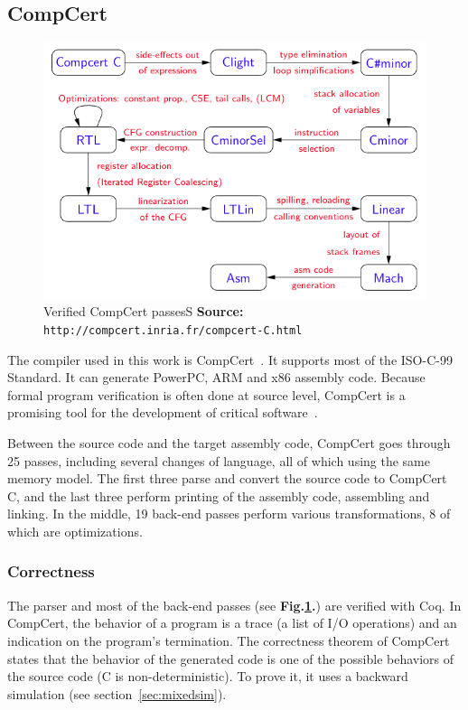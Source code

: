 \label{sec:prelim}
\subsection{CompCert}
\begin{figure}
\begin{center}
\includegraphics[scale=1.15]{img/passes.png}
\caption{Verified CompCert passes\hspace{\linewidth}S \textbf{Source: }\texttt{http://compcert.inria.fr/compcert-C.html}}
\label{fig:compcertpasses}
\end{center}
\end{figure}

The compiler used in this work is CompCert~\cite{compcertmanual}.
It supports most of the ISO-C-99 Standard.
It can generate PowerPC, ARM and x86 assembly code.
Because formal program verification is often done at source level, CompCert is a promising tool for the development of critical software~\cite{bedinfranca:hal-00653367}.

Between the source code and the target assembly code, CompCert goes through 25 passes, including several changes of language, all of which using the same memory model.
The first three parse and convert the source code to CompCert C, and the last three perform printing of the assembly code, assembling and linking.
In the middle, 19 back-end passes perform various transformations, 8 of which are optimizations.

\subsubsection{Correctness}
The parser and most of the back-end passes (see \textbf{Fig.\ref{fig:compcertpasses}.}) are verified with Coq.
In CompCert, the behavior of a program is a trace (a list of I/O operations) and an indication on the program's termination.
The correctness theorem of CompCert states that the behavior of the generated code is one of the possible behaviors of the source code (C is non-deterministic). To prove it, it uses a backward simulation (see section~\ref{sec:mixedsim}).

